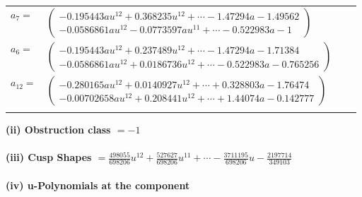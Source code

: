 \documentclass[1p]{elsarticle_modified}
\theoremstyle{definition}
\begin{document}
\begin{tabular}{m{7pt} m{180pt} m{7pt} m{180pt} }
\flushright $a_{7}=$&$\begin{pmatrix}-0.195443 a u^{12}+0.368235 u^{12}+\cdots-1.47294 a-1.49562\\-0.0586861 a u^{12}-0.0773597 a u^{11}+\cdots-0.522983 a-1\end{pmatrix}$ \\
\flushright $a_{6}=$&$\begin{pmatrix}-0.195443 a u^{12}+0.237489 u^{12}+\cdots-1.47294 a-1.71384\\-0.0586861 a u^{12}+0.0186736 u^{12}+\cdots-0.522983 a-0.765256\end{pmatrix}$ \\
\flushright $a_{12}=$&$\begin{pmatrix}-0.280165 a u^{12}+0.0140927 u^{12}+\cdots+0.328803 a-1.76474\\-0.00702658 a u^{12}+0.208441 u^{12}+\cdots+1.44074 a-0.142777\end{pmatrix}$\\&\end{tabular}
\flushleft \textbf{(ii) Obstruction class $= -1$}\\~\\
\flushleft \textbf{(iii) Cusp Shapes $= \frac{498055}{698206} u^{12}+\frac{527627}{698206} u^{11}+\cdots-\frac{3711195}{698206} u-\frac{2197714}{349103}$}\\~\\
\newpage\renewcommand{\arraystretch}{1}
\flushleft \textbf{(iv) u-Polynomials at the component}\newline \\
\end{document}
